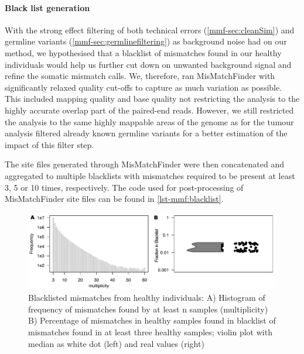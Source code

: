 \paragraph{Black list generation}
\label{mmf-sec:healthyBlacklist}
With the strong effect filtering of both technical errors (\autoref{mmf-sec:cleanSim}) and germline variants (\autoref{mmf-sec:germlinefiltering}) as background noise had on our method, we hypothesised that a blacklist of mismatches found in our healthy individuals would help us further cut down on unwanted background signal and refine the somatic mismatch calls. We, therefore, ran MisMatchFinder with significantly relaxed quality cut-offs to capture as much variation as possible. This included  mapping quality and base quality  not restricting the analysis to the highly accurate overlap part of the paired-end reads. However, we still restricted the analysis to the same highly mappable areas of the genome  as for the tumour analysis  filtered already known germline variants for a better estimation of the impact of this filter step.

The site files generated through MisMatchFinder were then concatenated and aggregated to multiple blacklists with mismatches required to be present at least 3, 5 or 10 times, respectively. The code used for post-processing of MisMatchFinder site files can be found in \autoref{lst-mmf:blacklist}.


\begin{figure}[ht]
\centering
\includegraphics[width=.99\linewidth]{Figures/MisMatchFinder/mmfBlackListStats.pdf}
\caption[Blacklisted mismatches from healthy individuals]{Blacklisted mismatches from healthy individuals: A) Histogram of frequency of mismatches found by at least n samples (multiplicity) B) Percentage of mismatches in healthy samples found in blacklist of mismatches found in at least three healthy samples; violin plot with median as white dot (left) and real values (right)}\label{fig:mmf-BlackListStats}
\end{figure}


